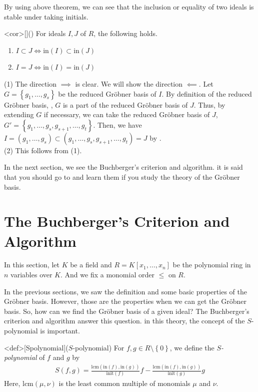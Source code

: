 \documentclass{article}
\begin{document}
By using above theorem, we can see that the inclusion or equality of two ideals is stable under taking initials.

\begin{statementsp}<cor>[]()
    For ideals $I, J$ of $R$, the following holds.
    \begin{enumerate}
        \item $I \subset J \iff \mathrm{in}(I) \subset \mathrm{in}(J)$
        \item $I = J \iff \mathrm{in}(I) = \mathrm{in}(J)$
    \end{enumerate}
\end{statementsp}
\begin{pfsp}
    (1) The direction $\implies$ is clear. We will show the direction $\impliedby$. Let $G = \left\{ g_1, \ldots, g_s \right\}$ be the reduced Gr\"{o}bner basis of $I$. By definition of the reduced Gr\"{o}bner basis, , $G$ is a part of the reduced Gr\"{o}bner basis of $J$. Thus, by extending $G$ if necessary, we can take the reduced Gr\"{o}bner basis of $J$, $G' = \left\{ g_1, \ldots, g_s, g_{s+1}, \ldots, g_t \right\}$. Then, we have $I = (g_1, \ldots, g_s) \subset (g_1, \ldots, g_s, g_{s+1}, \ldots, g_t) = J$ by .\\
    (2) This follows from (1).
\end{pfsp}

In the next section, we see the Buchberger's criterion and algorithm. it is said that you should go to and learn them if you study the theory of the Gr\"{o}bner basis. 

\newpage 

\section{The Buchberger's Criterion and Algorithm}
In this section, let $K$ be a field and $R = K[x_1, \ldots, x_n]$ be the polynomial ring in $n$ variables over $K$. And we fix a monomial order $\leq$ on $R$. 

In the previous sections, we saw the definition and some basic properties of the Gr\"{o}bner basis. However, those are the properties when we can get the Gr\"{o}bner basis. So, how can we find the Gr\"{o}bner basis of a given ideal? The Buchberger's criterion and algorithm answer this question. in this theory, the concept of the $S$-polynomial is important.

\begin{statementsp}<def>[Spolynomial]($S$-polynomial)
    For $f, g \in R \setminus \left\{ 0 \right\}$, we define the \textit{$S$-polynomial} of $f$ and $g$ by
    \begin{align}
        S(f,g) = \frac{\mathrm{lcm}(\mathrm{in}(f), \mathrm{in}(g))}{\mathrm{init}(f)} f - \frac{\mathrm{lcm}(\mathrm{in}(f), \mathrm{in}(g))}{\mathrm{init}(g)} g
    \end{align}
    Here, $\mathrm{lcm}(\mu, \nu)$ is the least common multiple of monomials $\mu$ and $\nu$. 
\end{statementsp}
\end{document}
